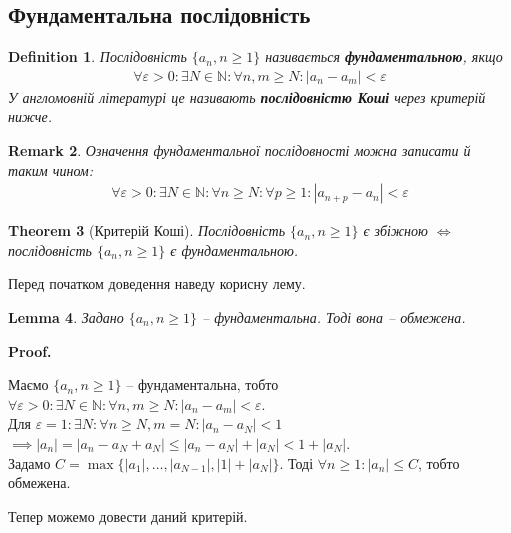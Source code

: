 \documentclass[a4paper, 14pt]{article}
\makeatletter
\def\qed{$\blacksquare$}
\theoremstyle{theoremdd}
\newtheorem{theorem}{Theorem}[subsection]
\theoremstyle{theoremdd}
\newtheorem{definition}[theorem]{Definition}
\theoremstyle{theoremdd}
\theoremstyle{theoremdd}
\theoremstyle{theoremdd}
\theoremstyle{theoremdd}
\newtheorem{remark}[theorem]{Remark}
\theoremstyle{theoremdd}
\newtheorem{lemma}[theorem]{Lemma}
\theoremstyle{theoremdd}
\renewenvironment{proof}[1][Proof.\\]{\par
\pushQED{\hfill \qed}%
\normalfont \topsep6\p@\@plus6\p@\relax
\trivlist
\item\relax
{\bfseries
#1\@addpunct{.}}\hspace\labelsep\ignorespaces
}{%
\popQED\endtrivlist\@endpefalse
}
\makeatother
\begin{document}
	\subsection{Фундаментальна послідовність}
	\begin{definition}
	Послідовність $\{a_n, n \geq 1\}$ називається \textbf{фундаментальною}, якщо
	\begin{align*}
	\forall \varepsilon > 0: \exists N \in \mathbb{N}: \forall n,m \geq N: |a_n - a_m| < \varepsilon
	\end{align*}
	У англомовній літературі це називають \textbf{послідовністю Коші} через критерій нижче.
	\end{definition}
	
	\begin{remark}
	Означення фундаментальної послідовності можна записати й таким чином:
	\begin{align*}
	\forall \varepsilon > 0: \exists N \in \mathbb{N}: \forall n \geq N: \forall p \geq 1: |a_{n+p} - a_n| < \varepsilon
	\end{align*}
	\end{remark}
	
	\begin{theorem}[Критерій Коші]
	Послідовність $\{a_n, n \geq 1\}$ є збіжною $\iff$ послідовність $\{a_n, n \geq 1\}$ є фундаментальною.
	\end{theorem}
	
	Перед початком доведення наведу корисну лему.
	
	\begin{lemma}
	Задано $\{a_n, n \geq 1\}$ -- фундаментальна. Тоді вона -- обмежена.
	\end{lemma}
	
	\begin{proof}
	Маємо $\{a_n, n \geq 1\}$ -- фундаментальна, тобто $\forall \varepsilon > 0: \exists N \in \mathbb{N}: \forall n,m \geq N: |a_n - a_m| < \varepsilon$.\\
	Для $\varepsilon = 1: \exists N: \forall n \geq N, m = N: |a_n - a_N| < 1$\\
	$\implies |a_n| = |a_n - a_N + a_N| \leq |a_n - a_N| + |a_N| < 1 + |a_N|$.\\
	Задамо $C = \max\{|a_1|, \dots, |a_{N-1}|, |1|+|a_N|\}$. Тоді $\forall n \geq 1: |a_n| \leq C$, тобто обмежена.
	\end{proof}
	
	Тепер можемо довести даний критерій.
	
\end{document}

